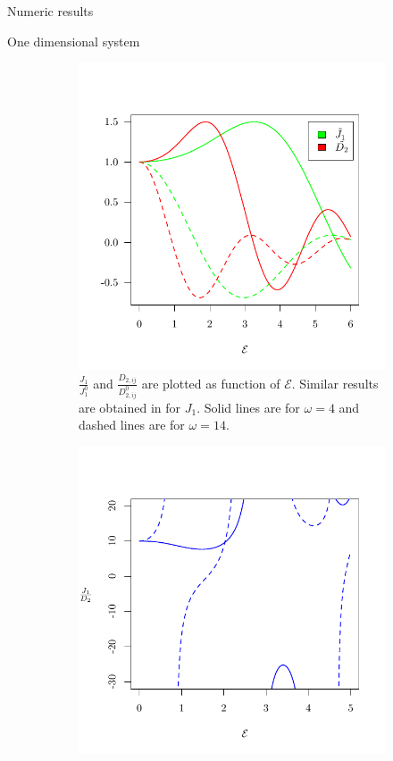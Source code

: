 \begin{section}{Numeric results}
\begin{subsection}{One dimensional system}
\begin{figure}
\centering
\begin{subfigure}{.45\textwidth}
  \includegraphics[width=1\linewidth]{Figures/NNvsNNN1.pdf}
  \caption{$\frac{J_{1}}{J_{1}^0}$ and $\frac{D_{2,ij}}{D_{2,ij}^0}$ are plotted as function of $\mathcal{E}$. Similar results are obtained in \cite{Mentink2015} for $J_{1}$. Solid lines are for $\omega = 4$ and dashed lines are for $\omega = 14$.}
  \label{Fig3.1:NNvsNNN}
\end{subfigure}%
\hspace*{\fill}
\begin{subfigure}{.45\textwidth}
  \includegraphics[width=1\linewidth]{Figures/ratio.pdf}

\end{subfigure}
\end{figure}
\end{subsection}
\end{section}
